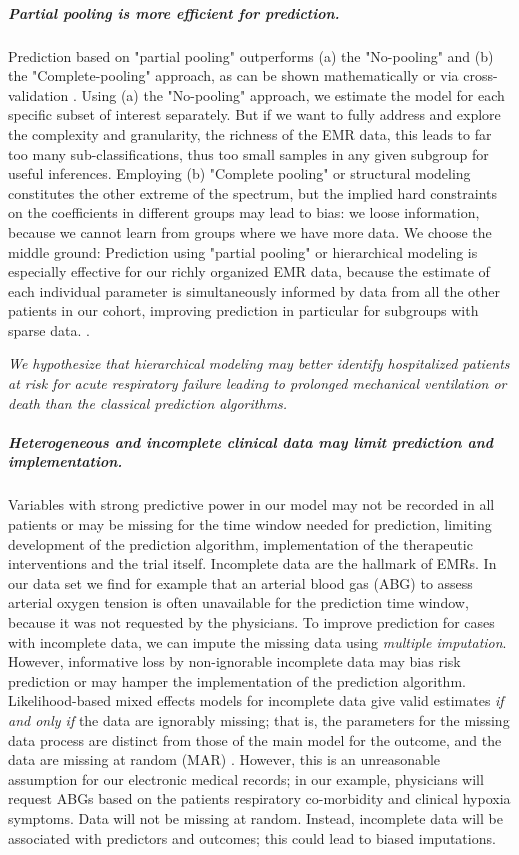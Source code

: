 \documentclass[11pt,notitlepage]{article}
\begin{document}
\subparagraph*{Partial pooling is more efficient for prediction.}
Prediction based on "partial pooling" outperforms (a) the "No-pooling" and (b) the "Complete-pooling" approach, as can be shown mathematically or via cross-validation \cite{Gelman-Hill_2014}. Using (a) the "No-pooling" approach, we estimate the model for each specific subset of interest separately. But if we want to fully address and explore the complexity and granularity, the richness of the EMR data, this leads to far too many sub-classifications, thus too small samples in any given subgroup for useful inferences. Employing (b) "Complete pooling" or structural modeling constitutes the other extreme of the spectrum, but the implied hard constraints on the coefficients in different groups may lead to bias: we loose information, because we cannot learn from groups where we have more data. We choose the middle ground: Prediction using "partial pooling" or hierarchical modeling is especially effective for our richly organized EMR data, because the estimate of each individual parameter is simultaneously informed by data from all the other patients in our cohort, improving prediction in particular for subgroups with sparse data. \cite{Gelman_multilevel_2006}. \newline

\emph{We hypothesize that hierarchical modeling may better identify hospitalized patients at risk for acute respiratory failure leading to prolonged mechanical ventilation or death than the classical prediction algorithms.}


\subparagraph*{Heterogeneous and incomplete clinical data may limit prediction and implementation.}
Variables with strong predictive power in our model may not be recorded in all patients or may be missing for the time window needed for prediction, limiting development of the prediction algorithm, implementation of the therapeutic interventions and the trial itself. Incomplete data are the hallmark of EMRs. In our data set we find for example that an arterial blood gas (ABG) to assess arterial oxygen tension is often unavailable for the prediction time window, because it was not requested by the physicians. To improve prediction for cases with incomplete data, we can impute the missing data using \textit{multiple imputation}. However, informative loss by non-ignorable incomplete data may bias risk prediction or may hamper the implementation of the prediction algorithm. Likelihood-based mixed effects models for incomplete data give valid estimates \textit{if and only if } the data are ignorably missing; that is, the parameters for the missing data process are distinct from those of the main model for the outcome, and the data are missing at random (MAR) \cite{Rubin_1976}. However, this is an unreasonable assumption for our electronic medical records; in our example, physicians will request ABGs based on the patients respiratory co-morbidity and clinical hypoxia symptoms. Data will not be missing at random. Instead, incomplete data will be associated with predictors and outcomes; this could lead to biased imputations.
\end{document}
